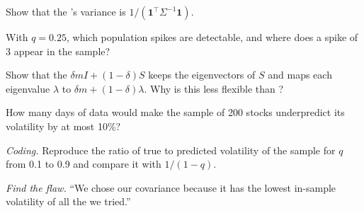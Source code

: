 \begin{exercise}[$\star$]\label{exo:qm:covariance-estimation-and-random-matrices:3}
Show that the 's variance is $1/(\mathbf 1^\top\Sigma^{-1}\mathbf 1)$.
\end{exercise}

\begin{exercise}[$\star\star$]\label{exo:qm:covariance-estimation-and-random-matrices:4}
With $q = 0.25$, which population spikes are detectable, and where does a spike of 3 appear in the sample?
\end{exercise}

\begin{exercise}[$\star\star$]\label{exo:qm:covariance-estimation-and-random-matrices:5}
Show that the  $\delta mI + (1 - \delta)S$ keeps the eigenvectors of $S$ and maps each eigenvalue $\lambda$ to $\delta m + (1 - \delta)\lambda$. Why is this less flexible than
?
\end{exercise}

\begin{exercise}[$\star\star$]\label{exo:qm:covariance-estimation-and-random-matrices:6}
How many days of data would make the sample  of 200 stocks underpredict its volatility by at most 10\%?
\end{exercise}

\begin{exercise}[$\star\star\star$]\label{exo:qm:covariance-estimation-and-random-matrices:7}
\emph{Coding.} Reproduce the ratio of true to predicted volatility of the sample  for $q$ from 0.1 to 0.9 and compare it with $1/(1 - q)$.
\end{exercise}

\begin{exercise}[$\star\star\star$]\label{exo:qm:covariance-estimation-and-random-matrices:8}
\emph{Find the flaw.} ``We chose our covariance  because it has the lowest in-sample  volatility of all the  we tried.''
\end{exercise}

